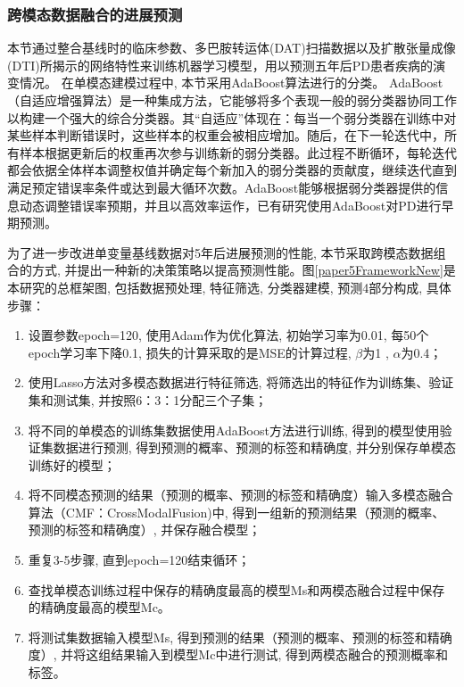 \subsubsection{跨模态数据融合的进展预测}
本节通过整合基线时的临床参数、多巴胺转运体(DAT)扫描数据以及扩散张量成像(DTI)所揭示的网络特性来训练机器学习模型，用以预测五年后PD患者疾病的演变情况。 在单模态建模过程中, 本节采用AdaBoost算法进行的分类。
AdaBoost（自适应增强算法）是一种集成方法，它能够将多个表现一般的弱分类器协同工作以构建一个强大的综合分类器。其“自适应”体现在：每当一个弱分类器在训练中对某些样本判断错误时，这些样本的权重会被相应增加。随后，在下一轮迭代中，所有样本根据更新后的权重再次参与训练新的弱分类器。此过程不断循环，每轮迭代都会依据全体样本调整权值并确定每个新加入的弱分类器的贡献度，继续迭代直到满足预定错误率条件或达到最大循环次数。AdaBoost能够根据弱分类器提供的信息动态调整错误率预期，并且以高效率运作，已有研究使用AdaBoost对PD进行早期预测\cite{anisha2020early}。

为了进一步改进单变量基线数据对5年后进展预测的性能, 本节采取跨模态数据组合的方式, 并提出一种新的决策策略以提高预测性能。图\ref{paper5FrameworkNew}是本研究的总框架图, 包括数据预处理, 特征筛选, 分类器建模, 预测4部分构成, 具体步骤：
\begin{enumerate}
\item 设置参数epoch=120, 使用Adam作为优化算法, 初始学习率为0.01, 每50个epoch学习率下降0.1, 损失的计算采取的是MSE的计算过程, $\beta$为1 , $\alpha$为0.4；
\item 使用Lasso方法对多模态数据进行特征筛选, 将筛选出的特征作为训练集、验证集和测试集, 并按照6：3：1分配三个子集；%
\item 将不同的单模态的训练集数据使用AdaBoost方法进行训练, 得到的模型使用验证集数据进行预测, 得到预测的概率、预测的标签和精确度, 并分别保存单模态训练好的模型；
\item 将不同模态预测的结果（预测的概率、预测的标签和精确度）输入多模态融合算法（CMF：CrossModalFusion)中, 得到一组新的预测结果（预测的概率、预测的标签和精确度）, 并保存融合模型；
\item 重复3-5步骤, 直到epoch=120结束循环；
\item 查找单模态训练过程中保存的精确度最高的模型Ms和两模态融合过程中保存的精确度最高的模型Mc。
\item 将测试集数据输入模型Ms, 得到预测的结果（预测的概率、预测的标签和精确度）, 并将这组结果输入到模型Mc中进行测试, 得到两模态融合的预测概率和标签。
\end{enumerate}


